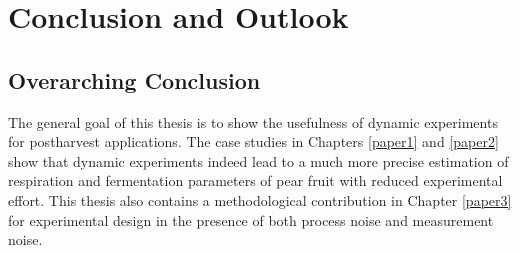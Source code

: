 \chapter{Conclusion and Outlook}
\label{conclusion}
\section{Overarching Conclusion}
The general goal of this thesis is to show the usefulness of dynamic experiments for postharvest applications. The case studies in Chapters \ref{paper1} and \ref{paper2} show that dynamic experiments indeed lead to a much more precise estimation of respiration and fermentation parameters of pear fruit with reduced experimental effort. This thesis also contains a methodological contribution in Chapter \ref{paper3} for experimental design in the presence of both process noise and measurement noise. 

